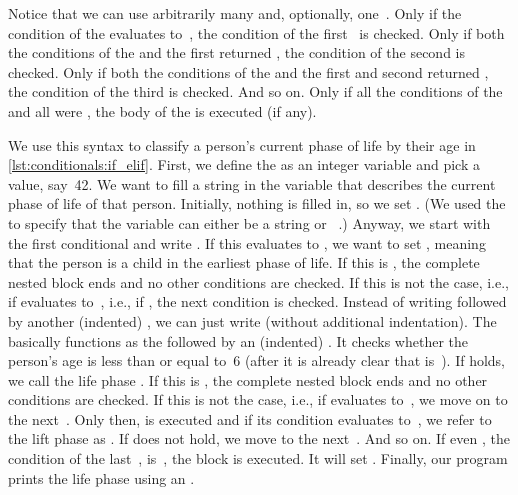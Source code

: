 %
Notice that we can use arbitrarily many  and, optionally, one~.
Only if the condition of the  evaluates to~, the condition of the first~ is checked.
Only if both the conditions of the  and the first  returned , the condition of the second  is checked.
Only if both the conditions of the  and the first and second  returned , the condition of the third  is checked.
And so on.
Only if all the conditions of the  and all  were , the body of the  is executed (if any).

We use this syntax to classify a person's current phase of life by their age in \cref{lst:conditionals:if_elif}.
First, we define the  as an integer variable and pick a value, say~42.
We want to fill a string in the variable  that describes the current phase of life of that person.
Initially, nothing is filled in, so we set .
(We used the   to specify that the variable can either be a string or ~\cite{PEP604}.)
Anyway, we start with the first conditional and write .
If this evaluates to , we want to set , meaning that the person is a child in the earliest phase of life.
If this is , the complete nested  block ends and no other conditions are checked.
If this is not the case, i.e., if  evaluates to~, i.e., if , the next condition is checked.
Instead of writing  followed by another (indented) , we can just write  (without additional indentation).
The  basically functions as the  followed by an (indented) .
It checks whether the person's age is less than or equal to~6 (after it is already clear that  is~).
If  holds, we call the life phase .
If this is , the complete nested  block ends and no other conditions are checked.
If this is not the case, i.e., if  evaluates to~, we move on to the next~.
Only then,  is executed and if its condition evaluates to~, we refer to the lift phase as .
If  does not hold, we move to the next~.
And so on.
If even , the condition of the last~, is~, the  block is executed.
It will set .
Finally, our program prints the life phase using an .

